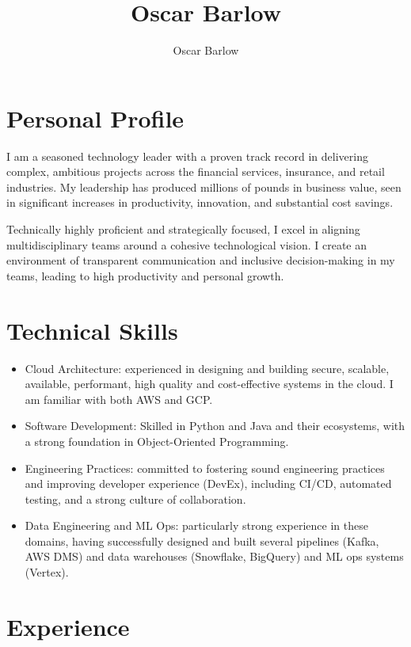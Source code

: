 \documentclass[a4paper]{scrartcl}
\author{Oscar Barlow}
\title{Oscar Barlow}
\date{}
\begin{document}
\maketitle

\section*{Personal Profile}
 { %
  \setlength{\parskip}{6pt plus 2pt minus 1pt}
  I am a seasoned technology leader with a proven track record in
  delivering complex, ambitious projects across the financial services,
  insurance,
  and retail industries. My leadership has produced
  millions of pounds in business value, seen in significant increases in
  productivity, innovation, and substantial cost savings.

  Technically highly proficient and strategically focused, I excel in aligning
  multidisciplinary
  teams around a cohesive technological vision. I create an environment of
  transparent communication and inclusive decision-making in my teams, leading to
  high productivity and personal growth.
 } %

\section*{Technical Skills}
\begin{itemize}
	\item Cloud Architecture: experienced in designing and building secure,
	      scalable, available, performant, high quality and cost-effective
	      systems in the
	      cloud. I am familiar with both AWS and GCP.
	\item Software Development: Skilled in Python and Java and their
	      ecosystems, with a
	      strong foundation in Object-Oriented Programming.
	\item Engineering Practices: committed to fostering sound engineering
	      practices and improving developer experience (DevEx), including
	      CI/CD,
	      automated testing, and a strong culture of collaboration.
	\item Data Engineering and ML Ops: particularly strong experience in
	      these domains, having successfully designed and built several
	      pipelines (Kafka, AWS DMS) and data warehouses (Snowflake,
	      BigQuery)
	      and ML ops systems (Vertex).
\end{itemize}

\section*{Experience}
\end{document}
